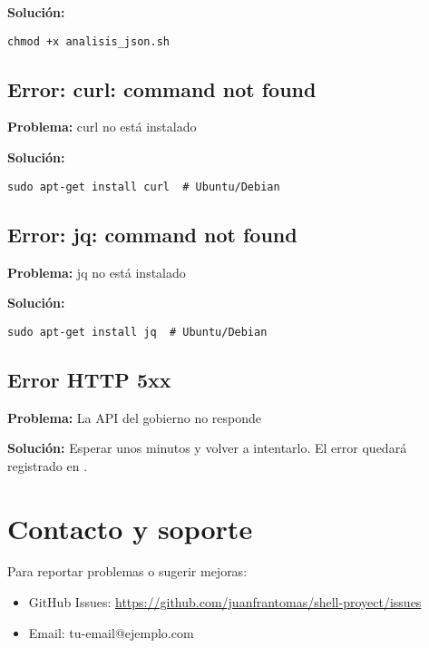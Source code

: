 \textbf{Solución:}
\begin{lstlisting}[style=bash]
chmod +x analisis_json.sh
\end{lstlisting}

\subsection{Error: curl: command not found}

\textbf{Problema:} curl no está instalado

\textbf{Solución:}
\begin{lstlisting}[style=bash]
sudo apt-get install curl  # Ubuntu/Debian
\end{lstlisting}

\subsection{Error: jq: command not found}

\textbf{Problema:} jq no está instalado

\textbf{Solución:}
\begin{lstlisting}[style=bash]
sudo apt-get install jq  # Ubuntu/Debian
\end{lstlisting}

\subsection{Error HTTP 5xx}

\textbf{Problema:} La API del gobierno no responde

\textbf{Solución:} Esperar unos minutos y volver a intentarlo. El error quedará registrado en .

\section{Contacto y soporte}

Para reportar problemas o sugerir mejoras:

\begin{itemize}
  \item GitHub Issues: \url{https://github.com/juanfrantomas/shell-proyect/issues}
  \item Email: tu-email@ejemplo.com
\end{itemize}
